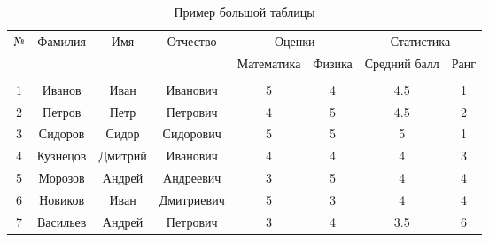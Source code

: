 \begin{table}[h!]
    \centering
    \caption{Пример большой таблицы}
    \begin{tabular}{|c|c|c|c|c|c|c|c|}
        \hline
        \multirow{3}{*}{№} & \multirow{3}{*}{Фамилия} & \multirow{3}{*}{Имя} & \multirow{3}{*}{Отчество} & \multicolumn{2}{c|}{Оценки} & \multicolumn{2}{c|}{Статистика}                       \\ \cline{5-8}
                           &                          &                      &                           & Математика                  & Физика                          & Средний балл & Ранг \\ \cline{5-8}
                           &                          &                      &                           &                             &                                 &              &      \\ \hline
        1                  & Иванов                   & Иван                 & Иванович                  & 5                           & 4                               & 4.5          & 1    \\ \hline
        2                  & Петров                   & Петр                 & Петрович                  & 4                           & 5                               & 4.5          & 2    \\ \hline
        3                  & Сидоров                  & Сидор                & Сидорович                 & 5                           & 5                               & 5            & 1    \\ \hline
        4                  & Кузнецов                 & Дмитрий              & Иванович                  & 4                           & 4                               & 4            & 3    \\ \hline
        5                  & Морозов                  & Андрей               & Андреевич                 & 3                           & 5                               & 4            & 4    \\ \hline
        6                  & Новиков                  & Иван                 & Дмитриевич                & 5                           & 3                               & 4            & 4    \\ \hline
        7                  & Васильев                 & Андрей               & Петрович                  & 3                           & 4                               & 3.5          & 6    \\ \hline

\end{tabular}
\end{table}
